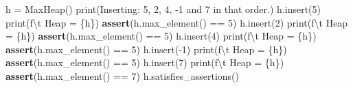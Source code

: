 \documentclass[
]{article}
\newenvironment{Shaded}{}{}
\newcommand{\BuiltInTok}[1]{\textcolor[rgb]{0.00,0.50,0.00}{#1}}
\newcommand{\CharTok}[1]{\textcolor[rgb]{0.25,0.44,0.63}{#1}}
\newcommand{\ControlFlowTok}[1]{\textcolor[rgb]{0.00,0.44,0.13}{\textbf{#1}}}
\newcommand{\DecValTok}[1]{\textcolor[rgb]{0.25,0.63,0.44}{#1}}
\newcommand{\NormalTok}[1]{#1}
\newcommand{\OperatorTok}[1]{\textcolor[rgb]{0.40,0.40,0.40}{#1}}
\newcommand{\SpecialCharTok}[1]{\textcolor[rgb]{0.25,0.44,0.63}{#1}}
\newcommand{\SpecialStringTok}[1]{\textcolor[rgb]{0.73,0.40,0.53}{#1}}
\newcommand{\StringTok}[1]{\textcolor[rgb]{0.25,0.44,0.63}{#1}}
\begin{document}
\begin{Shaded}
\begin{Highlighting}[]
\NormalTok{h }\OperatorTok{=}\NormalTok{ MaxHeap()}
\BuiltInTok{print}\NormalTok{(}\StringTok{\textquotesingle{}Inserting: 5, 2, 4, {-}1 and 7 in that order.\textquotesingle{}}\NormalTok{)}
\NormalTok{h.insert(}\DecValTok{5}\NormalTok{)}
\BuiltInTok{print}\NormalTok{(}\SpecialStringTok{f\textquotesingle{}}\CharTok{\textbackslash{}t}\SpecialStringTok{ Heap = }\SpecialCharTok{\{}\NormalTok{h}\SpecialCharTok{\}}\SpecialStringTok{\textquotesingle{}}\NormalTok{)}
\ControlFlowTok{assert}\NormalTok{(h.max\_element() }\OperatorTok{==} \DecValTok{5}\NormalTok{)}
\NormalTok{h.insert(}\DecValTok{2}\NormalTok{)}
\BuiltInTok{print}\NormalTok{(}\SpecialStringTok{f\textquotesingle{}}\CharTok{\textbackslash{}t}\SpecialStringTok{ Heap = }\SpecialCharTok{\{}\NormalTok{h}\SpecialCharTok{\}}\SpecialStringTok{\textquotesingle{}}\NormalTok{)}
\ControlFlowTok{assert}\NormalTok{(h.max\_element() }\OperatorTok{==} \DecValTok{5}\NormalTok{)}
\NormalTok{h.insert(}\DecValTok{4}\NormalTok{)}
\BuiltInTok{print}\NormalTok{(}\SpecialStringTok{f\textquotesingle{}}\CharTok{\textbackslash{}t}\SpecialStringTok{ Heap = }\SpecialCharTok{\{}\NormalTok{h}\SpecialCharTok{\}}\SpecialStringTok{\textquotesingle{}}\NormalTok{)}
\ControlFlowTok{assert}\NormalTok{(h.max\_element() }\OperatorTok{==} \DecValTok{5}\NormalTok{)}
\NormalTok{h.insert(}\OperatorTok{{-}}\DecValTok{1}\NormalTok{)}
\BuiltInTok{print}\NormalTok{(}\SpecialStringTok{f\textquotesingle{}}\CharTok{\textbackslash{}t}\SpecialStringTok{ Heap = }\SpecialCharTok{\{}\NormalTok{h}\SpecialCharTok{\}}\SpecialStringTok{\textquotesingle{}}\NormalTok{)}
\ControlFlowTok{assert}\NormalTok{(h.max\_element() }\OperatorTok{==} \DecValTok{5}\NormalTok{)}
\NormalTok{h.insert(}\DecValTok{7}\NormalTok{)}
\BuiltInTok{print}\NormalTok{(}\SpecialStringTok{f\textquotesingle{}}\CharTok{\textbackslash{}t}\SpecialStringTok{ Heap = }\SpecialCharTok{\{}\NormalTok{h}\SpecialCharTok{\}}\SpecialStringTok{\textquotesingle{}}\NormalTok{)}
\ControlFlowTok{assert}\NormalTok{(h.max\_element() }\OperatorTok{==} \DecValTok{7}\NormalTok{)}
\NormalTok{h.satisfies\_assertions()}


\end{Highlighting}
\end{Shaded}
\end{document}
